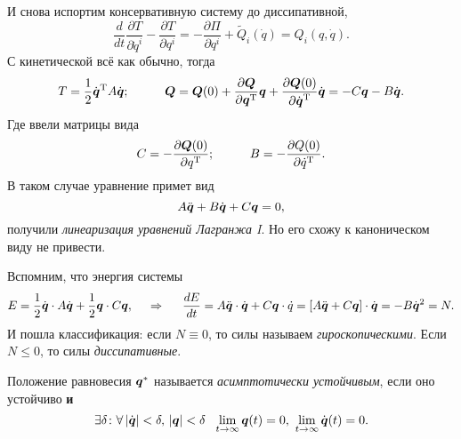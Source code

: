 И снова испортим консервативную систему до диссипативной,
\begin{equation*}
    \frac{d }{d t} \frac{\partial T}{\partial \dot{q}^i} - \frac{\partial T}{\partial q^i} = - \frac{\partial \Pi}{\partial q^i} + \tilde Q_i(\dot{q}) = Q_i(q, \dot{q}).
\end{equation*}
С кинетической всё как обычно, тогда
\begin{equation*}
    T = \frac{1}{2} \dot{\mbox{\boldmath $q$}}^{\text{T}} A \dot{\mbox{\boldmath $q$}};
    \hspace{1 cm}
    \mbox{\boldmath $Q$} = \mbox{\boldmath $Q$}(0) + \frac{\partial \mbox{\boldmath $Q$}}{\partial \mbox{\boldmath $q$}^{\text{T}}} \mbox{\boldmath $q$} + \frac{\partial \mbox{\boldmath $Q$}(0)}{\partial \dot{\mbox{\boldmath $q$}}^{\text{T}}} \dot{\mbox{\boldmath $q$}} = - C \mbox{\boldmath $q$} - B \dot{\mbox{\boldmath $q$}}.
\end{equation*}
Где ввели матрицы вида
\begin{equation*}
    C = - \frac{\partial \mbox{\boldmath $Q$}(0)}{\partial q^{\text{T}}};
    \hspace{1 cm}
    B = - \frac{\partial Q (0)}{\partial \dot{q}^{\text{T}}}.
\end{equation*}
В таком случае уравнение примет вид
\begin{equation}
    A \ddot{\mbox{\boldmath $q$}} + B \dot{\mbox{\boldmath $q$}} + C \mbox{\boldmath $q$} = 0,
\end{equation}
получили \textit{линеаризация уравнений Лагранжа I}.
Но его схожу к каноническом виду не привести.

Вспомним, что энергия системы
\begin{equation*}
    E = \frac{1}{2} \dot{\mbox{\boldmath $q$}} \cdot A \dot{\mbox{\boldmath $q$}} + \frac{1}{2} \mbox{\boldmath $q$} \cdot C \mbox{\boldmath $q$},
    \hspace{0.5cm} \Rightarrow \hspace{0.5cm}
    \frac{d E}{d t} = A \ddot{\mbox{\boldmath $q$}} \cdot \dot{\mbox{\boldmath $q$}} + C \mbox{\boldmath $q$} \cdot \dot{q} =
    \left[
        A \ddot{\mbox{\boldmath $q$}} + C \mbox{\boldmath $q$}
    \right] \cdot \dot{\mbox{\boldmath $q$}} = - B \dot{\mbox{\boldmath $q$}}^2 = N.
\end{equation*}
И пошла классификация: если $N \equiv 0$, то силы называем \textit{гироскопическими}. Если $N \leq 0$, то силы \textit{диссипативные}. 


\begin{to_def}
    Положение равновесия $\mbox{\boldmath $q$}^*$ называется \textit{асимптотически устойчивым}, если оно устойчиво \textbf{и} 
    \begin{equation*}
        \exists \delta \colon  \forall\,  |\dot{\vc{q}}| < \delta, \, |\vc{q}| < \delta \ \ 
        \lim_{t \to \infty} \vc{q}(t) = 0, \ 
        \lim_{t \to \infty} \dot{\vc{q}}(t) = 0.
    \end{equation*}
\end{to_def}


